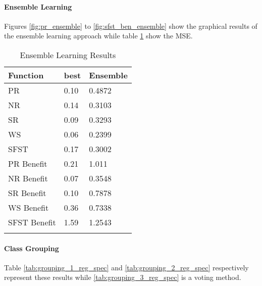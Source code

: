 \documentclass[12pt,letterpaper]{article}
\begin{document}
\paragraph{Ensemble Learning}
Figures \ref{fig:pr_ensemble} to \ref{fig:sfst_ben_ensemble} show the graphical results of the ensemble learning approach while table \ref{tab:ensmeble} show the MSE.


\begin{longtable}{|p{3cm}|p{4cm}|p{4cm}|}
\hline
\textbf{Function} & \textbf{best} & \textbf{Ensemble}  \\ \hline


PR & 0.10 & 0.4872 \\ \hline
NR & 0.14 & 0.3103\\\hline
SR & 0.09 & 0.3293  \\ \hline
WS & 0.06 & 0.2399  \\ \hline
SFST & 0.17 & 0.3002  \\ \hline

PR Benefit & 0.21 & 1.011 \\ \hline
NR Benefit & 0.07 & 0.3548 \\ \hline
SR Benefit & 0.10 & 0.7878  \\ \hline
WS Benefit & 0.36 & 0.7338  \\ \hline
SFST Benefit & 1.59 & 1.2543  \\ \hline
\caption{Ensemble Learning Results}
\label{tab:ensmeble}
\end{longtable}


\paragraph{Class Grouping}
Table \ref{tab:grouping_1_reg_spec} and \ref{tab:grouping_2_reg_spec} respectively represent these results while \ref{tab:grouping_3_reg_spec} is a voting method.
\end{document}
